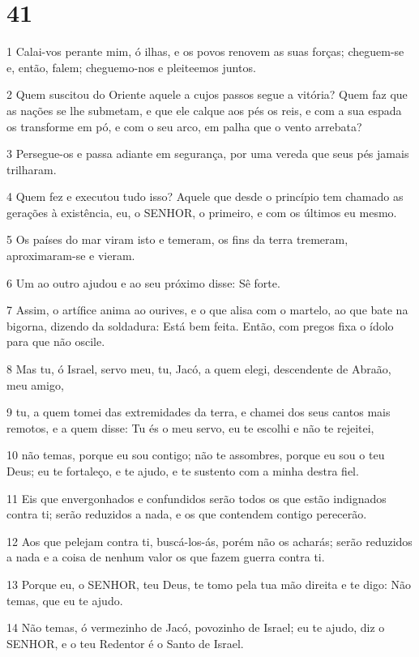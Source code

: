 \chapter{41}

\par 1 Calai-vos perante mim, ó ilhas, e os povos renovem as suas forças; cheguem-se e, então, falem; cheguemo-nos e pleiteemos juntos.
\par 2 Quem suscitou do Oriente aquele a cujos passos segue a vitória? Quem faz que as nações se lhe submetam, e que ele calque aos pés os reis, e com a sua espada os transforme em pó, e com o seu arco, em palha que o vento arrebata?
\par 3 Persegue-os e passa adiante em segurança, por uma vereda que seus pés jamais trilharam.
\par 4 Quem fez e executou tudo isso? Aquele que desde o princípio tem chamado as gerações à existência, eu, o SENHOR, o primeiro, e com os últimos eu mesmo.
\par 5 Os países do mar viram isto e temeram, os fins da terra tremeram, aproximaram-se e vieram.
\par 6 Um ao outro ajudou e ao seu próximo disse: Sê forte.
\par 7 Assim, o artífice anima ao ourives, e o que alisa com o martelo, ao que bate na bigorna, dizendo da soldadura: Está bem feita. Então, com pregos fixa o ídolo para que não oscile.
\par 8 Mas tu, ó Israel, servo meu, tu, Jacó, a quem elegi, descendente de Abraão, meu amigo,
\par 9 tu, a quem tomei das extremidades da terra, e chamei dos seus cantos mais remotos, e a quem disse: Tu és o meu servo, eu te escolhi e não te rejeitei,
\par 10 não temas, porque eu sou contigo; não te assombres, porque eu sou o teu Deus; eu te fortaleço, e te ajudo, e te sustento com a minha destra fiel.
\par 11 Eis que envergonhados e confundidos serão todos os que estão indignados contra ti; serão reduzidos a nada, e os que contendem contigo perecerão.
\par 12 Aos que pelejam contra ti, buscá-los-ás, porém não os acharás; serão reduzidos a nada e a coisa de nenhum valor os que fazem guerra contra ti.
\par 13 Porque eu, o SENHOR, teu Deus, te tomo pela tua mão direita e te digo: Não temas, que eu te ajudo.
\par 14 Não temas, ó vermezinho de Jacó, povozinho de Israel; eu te ajudo, diz o SENHOR, e o teu Redentor é o Santo de Israel.

